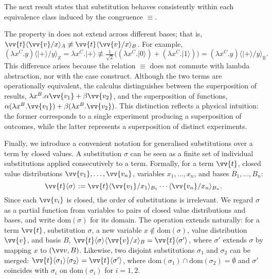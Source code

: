 \documentclass[runningheads,orivec,envcountsame,envcountsect]{llncs}
\providecommand{\qed}{\hbox{\rule{1ex}{1ex}}}%
\newcommand\ket[1]{\ensuremath{|#1\rangle}}
\newcommand\ansubst[2]{\ensuremath{\langle #1 \rangle_{#2}}}
\newcommand\dom[1]{\mathrm{dom}(#1)}
\def\Lam#1#2#3{\lambda#1^{#2}{.}#3} %
\newcommand\B{\mathbb B}
\newcommand\XB{\mathbb X}
\begin{document}
The next result states that substitution behaves consistently within each
equivalence class induced by the congruence $\equiv$.


\begin{remark}
  The property in  does not extend across
  different bases; that is,
  $\vv{t}\ansubst{\vv{v}/x}{A}\not\equiv\vv{t}\ansubst{\vv{v}/x}{B}$.
  For example,
  \[
    (\Lam{x}{C}{y})\ansubst{\ket{+}/y}{\XB}
    = \Lam{x}{C}{\ket{+}} 
    \not\equiv
    \tfrac{1}{\sqrt{2}}\big((\Lam{x}{C}{\ket{0}})
    + (\Lam{x}{C}{\ket{1}})\big)
    = (\Lam{x}{C}{y})\ansubst{\ket{+}/y}{\B}.
  \]
  This difference arises because the relation $\equiv$ does not commute with
  lambda abstraction, nor with the case construct. Although the two terms are
  operationally equivalent, the calculus distinguishes between the
  superposition of results,
  $\Lam{x}{B}{\alpha\vv{v_1} + \beta\vv{v_2}}$,
  and the superposition of functions,
  $\alpha(\Lam{x}{B}{\vv{v_1}}) + \beta(\Lam{x}{B}{\vv{v_2}})$.
  This distinction reflects a physical intuition: the former corresponds to a
  single experiment producing a superposition of outcomes, while the latter
  represents a superposition of distinct experiments.
\end{remark}

Finally, we introduce a convenient notation for generalised substitutions over
a term by closed values. A substitution $\sigma$ can be seen as a finite set of
individual substitutions applied consecutively to a term. Formally, for a term
$\vv{t}$, closed value distributions $\vv{v_1},\dots,\vv{v_n}$, variables
$x_1,\dots,x_n$, and bases $B_1,\dots,B_n$:
\[
  \vv{t}\ansubst{\sigma}{}
  := \vv{t}\ansubst{\vv{v_1}/x_1}{B_1}\dotsb\ansubst{\vv{v_n}/x_n}{B_n}.
\]
Since each $\vv{v_i}$ is closed, the order of substitutions is irrelevant. We
regard $\sigma$ as a partial function from variables to pairs of closed value
distributions and bases, and write $\dom{\sigma}$ for its domain. The operation
extends naturally: for a term $\vv{t}$, substitution $\sigma$, a new variable
$x\notin\dom{\sigma}$, value distribution $\vv{v}$, and basis $B$,
\(
  \vv{t}\ansubst{\sigma}{}\ansubst{\vv{v}/x}{B}
  = \vv{t}\ansubst{\sigma'}{}
\),
where $\sigma'$ extends $\sigma$ by mapping $x$ to $(\vv v,B)$. Likewise, two
disjoint substitutions $\sigma_1$ and $\sigma_2$ can be merged:
\(
  \vv{t}\ansubst{\sigma_1}{}\ansubst{\sigma_2}{}
  = \vv{t}\ansubst{\sigma'}{}
\),
where $\dom{\sigma_1}\cap\dom{\sigma_2}=\emptyset$ and $\sigma'$ coincides with
$\sigma_i$ on $\dom{\sigma_i}$ for $i=1,2$.
\end{document}
